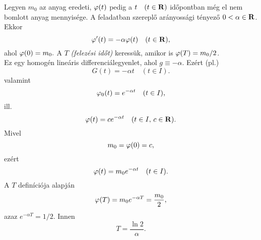 Legyen $m_0$ az anyag eredeti, $\varphi(t)$ pedig a $t \quad (t \in \mathbf{R})$ időpontban még el nem bomlott anyag mennyisége. A feladatban szereplő arányossági tényező $0 < \alpha \in \mathbf{R}$. Ekkor
\[
	\varphi'(t) = -\alpha \varphi(t) \quad (t \in \mathbf{R}),
\]
ahol $\varphi(0) = m_0.$ A $T$ \textit{(felezési időt)} keressük, amikor is $\varphi(T) = m_0 / 2$.\\

Ez egy homogén lineáris differenciálegyenlet, ahol $g \equiv -\alpha$. Ezért (pl.)
\[
	G(t) = -\alpha t \quad (t \in I).
\]
valamint
\[
	\varphi_0(t) = e^{- \alpha t} \quad (t \in I),
\]
ill.
\[
	\varphi(t)  = c e ^{- \alpha t } \quad (t \in I, \, c \in \mathbf{R}).
\]
Mivel
\[
	m_0 = \varphi(0) = c,
\]
ezért
\[
	\varphi(t) = m_0 e^{- \alpha t} \quad (t \in I).
\]
A $T$ definíciója alapján
\[
	\varphi(T) = m_0 e^{- \alpha T} = \frac{m_0}{2},
\]
azaz $e^{- \alpha T} = 1 /2$. Innen
\[
	T = \frac{\ln 2}{\alpha}.
\]